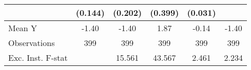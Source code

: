 {\begin{tabular}{l*{5}{c}}
            &     (0.144)         &     (0.202)         &     (0.399)         &     (0.031)         &                     \\
\midrule
Mean Y      &       -1.40         &       -1.40         &        1.87         &       -0.14         &       -1.40         \\
Observations&         399         &         399         &         399         &         399         &         399         \\
Exc. Inst. F-stat&                     &      15.561         &      43.567         &       2.461         &       2.234         \\
\bottomrule
\end{tabular}
}
